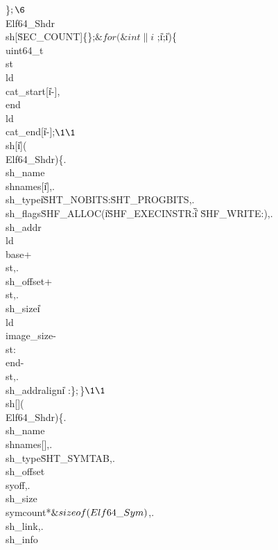 $ $\}$  ;\6
${}\\{Elf64\_Shdr}\\{sh}[\.{SEC\_COUNT}]\K\{\};$ \&{for} (\&{int} \|i${}\K%
;{}$ ${}\|i\Z{};{}$ ${}\|i\PP)$ $\{$ $\\{uint64\_t}\\{st}\K\\{ld}\MG%
\\{cat\_start}[\|i-],\\{end}\K\\{ld}\MG\\{cat\_end}[\|i-];$ \1%
\1${}\\{sh}[\|i]\K(\\{Elf64\_Shdr})$ $\{$ $.$ $\\{sh\_name}\K\\{shnames}[\|i]$
$,$ $.$ $\\{sh\_type}\K\|i\E{}\?\.{SHT\_NOBITS}:\.{SHT\_PROGBITS}$ $,$ $.$ $%
\\{sh\_flags}\K\.{SHF\_ALLOC}\OR(\|i\E{}\?\.{SHF\_EXECINSTR}:\|i\G{}\?%
\.{SHF\_WRITE}:)$ $,$ $.$ $\\{sh\_addr}\K\\{ld}\MG\\{base}+\\{st}$ $,$ $.$
$\\{sh\_offset}\K{}+\\{st}$ $,$ $.$ $\\{sh\_size}\K\|i\E{}\?\\{ld}\MG%
\\{image\_size}-\\{st}:\\{end}-\\{st}$ $,$ $.$ $\\{sh\_addralign}\K\|i\E{}\?%
:$ $\}$  ; $\}$ \1\1${}\\{sh}[]\K(\\{Elf64\_Shdr})$ $\{$ $.$
$\\{sh\_name}\K\\{shnames}[]$ $,$ $.$ $\\{sh\_type}\K\.{SHT\_SYMTAB}$ $,$
$.$ $\\{sh\_offset}\K\\{syoff}$ $,$ $.$ $\\{sh\_size}\K\\{symcount}*{}$%
\&{sizeof} (\\{Elf64\_Sym}) $,$ $.$ $\\{sh\_link}\K{}$ $,$ $.$ $\\{sh\_info}%
